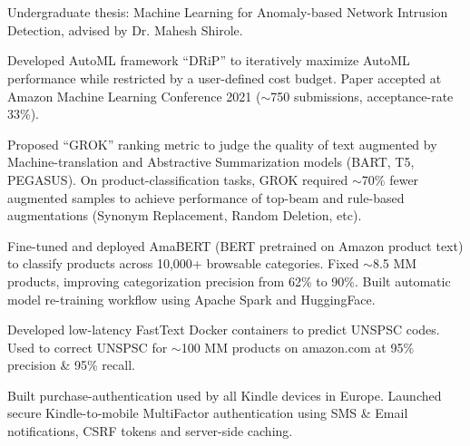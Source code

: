 \documentclass[]{deedy-resume-openfont}
\begin{document}
\descript{}\\
  \\
\subsubsectionsep
Undergraduate thesis: Machine Learning for Anomaly-based Network Intrusion Detection, advised by Dr. Mahesh Shirole.
\subsectionsep


\descript{}

\begin{tightemize}
    \item Developed AutoML framework ``DRiP'' to iteratively maximize AutoML performance while restricted by a user-defined cost budget. Paper accepted at Amazon Machine Learning Conference 2021 ($\sim$750 submissions, acceptance-rate 33\%).
    \item Proposed ``GROK'' ranking metric to judge the quality of text augmented by Machine-translation and Abstractive Summarization models (BART, T5, PEGASUS). On product-classification tasks, GROK required $\sim$70\% fewer augmented samples to achieve performance of top-beam and rule-based augmentations (Synonym Replacement, Random Deletion, etc).
\end{tightemize}
\sectionsep

\begin{tightemize}
    \item Fine-tuned and deployed AmaBERT (BERT pretrained on Amazon product text) to classify products across 10,000+ browsable categories. Fixed $\sim$8.5 MM products, improving categorization precision from 62\% to 90\%. Built automatic model re-training workflow using Apache Spark and HuggingFace. 
    \item Developed low-latency FastText Docker containers to predict UNSPSC codes. Used to correct UNSPSC for $\sim$100 MM products on amazon.com at 95\% precision \& 95\% recall.
\end{tightemize}
\sectionsep

 
\begin{tightemize}
    \item Built purchase-authentication used by all Kindle devices in Europe. Launched secure Kindle-to-mobile \mbox{MultiFactor} authentication using SMS \& Email notifications, CSRF tokens and server-side caching.
\end{tightemize}
\sectionsep
\end{document}
